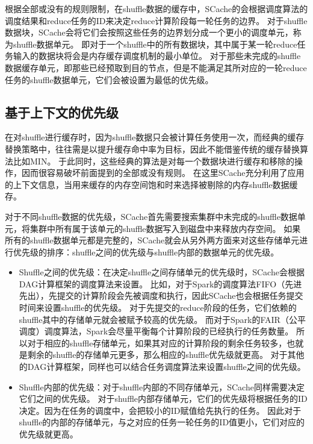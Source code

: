 根据全部或没有的规则限制，在shuffle数据的缓存中，SCache的会根据调度算法的调度结果和reduce任务的ID来决定reduce计算阶段每一轮任务的边界。
对于shuffle数据块，SCache会将它们会按照这些任务的边界划分成一个更小的调度单元，称为shuffle数据单元。
即对于一个shuffle中的所有数据块，其中属于某一轮reduce任务输入的数据块将会是内存缓存调度机制的最小单位。
对于那些未完成的shuffle数据缓存单元，即那些已经预取到目的节点，但是不能满足其所对应的一轮reduce任务的shuffle数据单元，它们会被设置为最低的优先级。


\subsection{基于上下文的优先级}

在对shuffle进行缓存时，因为shuffle数据只会被计算任务使用一次，而经典的缓存替换策略中，往往需是以提升缓存命中率为目标，因此不能借鉴传统的缓存替换算法比如MIN\cite{min}。
于此同时，这些经典的算法是对每一个数据块进行缓存和移除的操作，因而很容易破坏前面提到的全部或没有规则。
在这里SCache充分利用了应用的上下文信息，当用来缓存的内存空间饱和时来选择被剔除的内存shuffle数据缓存。

对于不同shuffle数据的优先级，SCache首先需要搜索集群中未完成的shuffle数据单元，将集群中所有属于该单元的shuffle数据写入到磁盘中来释放内存空间。
如果所有的shuffle数据单元都是完整的，SCache就会从另外两方面来对这些存储单元进行优先级的排序：shuffle之间的优先级与shuffle内部的数据单元的优先级。

\begin{itemize}
	\item Shuffle之间的优先级：在决定shuffle之间存储单元的优先级时，SCache会根据DAG计算框架的调度算法来设置。
	比如，对于Spark的调度算法FIFO（先进先出），先提交的计算阶段会先被调度和执行，因此SCache也会根据任务提交时间来设置shuffle的优先级。
	对于先提交的reduce阶段的任务，它们依赖的shuffle其中的存储单元就会被赋予较高的优先级。
	而对于Spark的FAIR（公平调度）调度算法，Spark会尽量平衡每个计算阶段的已经执行的任务数量。
	所以对于相应的shuffle存储单元，如果其对应的计算阶段的剩余任务较多，也就是剩余的shuffle的存储单元更多，那么相应的shuffle优先级就更高。
	对于其他的DAG计算框架，同样也可以结合任务调度算法来设置shuffle之间的优先级。
	\item Shuffle内部的优先级：对于shuffle内部的不同存储单元，SCache同样需要决定它们之间的优先级。
	对于shuffle内部存储单元，它们的优先级将根据任务的ID决定。因为在任务的调度中，会把较小的ID赋值给先执行的任务。
	因此对于shuffle的内部的存储单元，与之对应的任务一轮任务的ID值更小，它们对应的优先级就更高。
\end{itemize}

